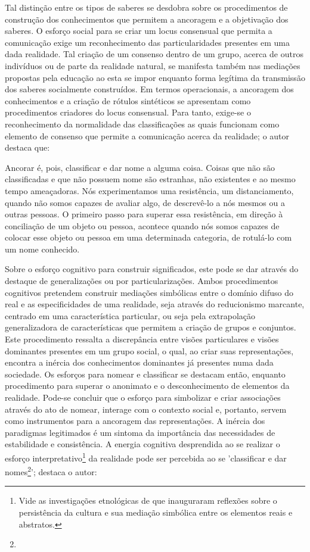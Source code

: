 \documentclass[
  12pt,       %
  openright,      %
  twoside,      %
  a4paper,      %
  english,      %
  french,       %
  spanish,      %
  brazil        %
  ]{abntex2}
\begin{document}
Tal distinção entre os tipos de saberes se desdobra sobre os procedimentos de construção dos conhecimentos que permitem a ancoragem e a objetivação dos saberes. O esforço social para se criar um locus consensual que permita a comunicação exige um reconhecimento das particularidades presentes em uma dada realidade. Tal criação de um consenso dentro de um grupo, acerca de outros indivíduos ou de parte da realidade natural, se manifesta também nas mediações propostas pela educação ao esta se impor enquanto forma legítima da transmissão dos saberes socialmente construídos. Em termos operacionais, a ancoragem dos conhecimentos e a criação de rótulos sintéticos se apresentam como procedimentos criadores do locus consensual. Para tanto, exige-se o reconhecimento da normalidade das classificações as quais funcionam como elemento de consenso que permite a comunicação acerca da realidade; o autor destaca que:

\begin{citacao}
Ancorar é, pois, classificar e dar nome a alguma coisa. Coisas
que não são classificadas e que não possuem nome são estranhas,
não existentes e ao mesmo tempo ameaçadoras. Nós experimentamos 
uma resistência, um distanciamento, quando não somos 
capazes de avaliar algo, de descrevê-lo a nós mesmos ou a outras
pessoas. O primeiro passo para superar essa resistência, em 
direção à conciliação de um objeto ou pessoa, acontece quando nós
somos capazes de colocar esse objeto ou pessoa em uma 
determinada categoria, de rotulá-lo com um nome conhecido.\cite[p.61-62]{Representacees_sociais_moscovici}
\end{citacao}


Sobre o esforço cognitivo para construir significados, este pode se dar através do destaque de generalizações ou por particularizações. Ambos procedimentos cognitivos pretendem construir mediações simbólicas entre o domínio difuso do real e as especificidades de uma realidade, seja através do reducionismo marcante, centrado em uma característica particular, ou seja pela extrapolação generalizadora de características que permitem a criação de grupos e conjuntos. Este procedimento ressalta a discrepância entre visões particulares e visões dominantes presentes em um grupo social, o qual, ao criar suas representações, encontra a inércia dos conhecimentos dominantes já presentes numa dada sociedade. Os esforços para nomear e classificar se destacam então, enquanto procedimento para superar o anonimato e o desconhecimento de elementos da realidade. Pode-se concluir que o esforço para simbolizar e criar associações através do ato de nomear, interage com o contexto social e, portanto, servem como instrumentos para a ancoragem das representações. A inércia dos paradigmas legitimados é um sintoma da importância das necessidades de estabilidade e consistência. A energia cognitiva desprendida ao se realizar o esforço interpretativo\footnote{Vide as investigações etnológicas de  que inauguraram reflexões sobre o persistência da cultura e sua mediação simbólica entre os elementos reais e abstratos.} da realidade pode ser percebida ao se 'classificar e dar nomes\footnote{}'; destaca o autor:
\end{document}
